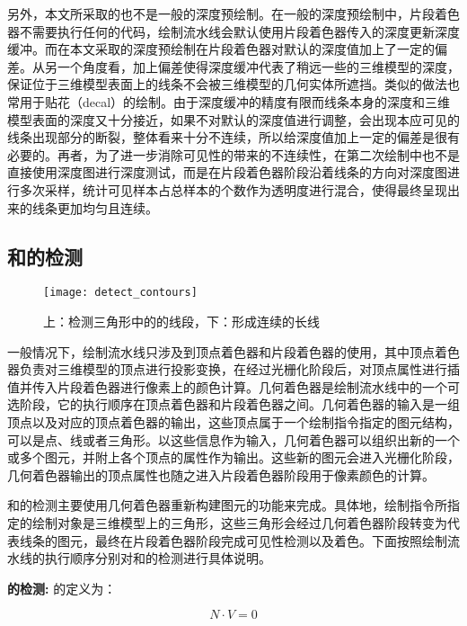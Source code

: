 另外，本文所采取的也不是一般的深度预绘制。在一般的深度预绘制中，片段着色器不需要执行任何的代码，绘制流水线会默认使用片段着色器传入的深度更新深度缓冲。而在本文采取的深度预绘制在片段着色器对默认的深度值加上了一定的偏差。从另一个角度看，加上偏差使得深度缓冲代表了稍远一些的三维模型的深度，保证位于三维模型表面上的线条不会被三维模型的几何实体所遮挡。类似的做法也常用于贴花（decal）的绘制。由于深度缓冲的精度有限而线条本身的深度和三维模型表面的深度又十分接近，如果不对默认的深度值进行调整，会出现本应可见的线条出现部分的断裂，整体看来十分不连续，所以给深度值加上一定的偏差是很有必要的。再者，为了进一步消除可见性的带来的不连续性，在第二次绘制中也不是直接使用深度图进行深度测试，而是在片段着色器阶段沿着线条的方向对深度图进行多次采样，统计可见样本占总样本的个数作为透明度进行混合，使得最终呈现出来的线条更加均匀且连续。

\subsection{\con{}和\scon{}的检测}

\begin{figure}[!t]
    \centering
    \texttt{[image: detect\_contours]}
    \caption{\label{fig:detect_contours}
    上：检测三角形中的\con{}的线段，下：形成连续的长线}
\end{figure}

一般情况下，绘制流水线只涉及到顶点着色器和片段着色器的使用，其中顶点着色器负责对三维模型的顶点进行投影变换，在经过光栅化阶段后，对顶点属性进行插值并传入片段着色器进行像素上的颜色计算。几何着色器是绘制流水线中的一个可选阶段，它的执行顺序在顶点着色器和片段着色器之间。几何着色器的输入是一组顶点以及对应的顶点着色器的输出，这些顶点属于一个绘制指令指定的图元结构，可以是点、线或者三角形。以这些信息作为输入，几何着色器可以组织出新的一个或多个图元，并附上各个顶点的属性作为输出。这些新的图元会进入光栅化阶段，几何着色器输出的顶点属性也随之进入片段着色器阶段用于像素颜色的计算。

和\scon{}的检测主要使用几何着色器重新构建图元的功能来完成。具体地，绘制指令所指定的绘制对象是三维模型上的三角形，这些三角形会经过几何着色器阶段转变为代表线条的图元，最终在片段着色器阶段完成可见性检测以及着色。下面按照绘制流水线的执行顺序分别对\con{}和\scon{}的检测进行具体说明。

\textbf{\con{}的检测:} \con{}的定义为：

\begin{equation}
    N\cdot{V} = 0
\end{equation}


